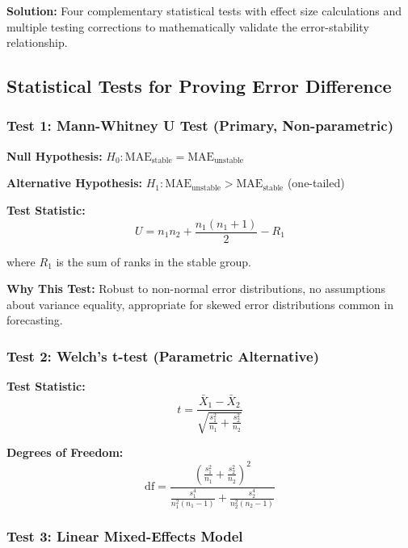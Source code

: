 \documentclass[11pt,a4paper]{article}
\begin{document}
\begin{solutionbox}
\textbf{Solution:} Four complementary statistical tests with effect size calculations and multiple testing corrections to mathematically validate the error-stability relationship.
\end{solutionbox}

\subsection{Statistical Tests for Proving Error Difference}

\subsubsection{Test 1: Mann-Whitney U Test (Primary, Non-parametric)}

\textbf{Null Hypothesis:} $H_0: \text{MAE}_{\text{stable}} = \text{MAE}_{\text{unstable}}$

\textbf{Alternative Hypothesis:} $H_1: \text{MAE}_{\text{unstable}} > \text{MAE}_{\text{stable}}$ (one-tailed)

\textbf{Test Statistic:}
\begin{equation}
U = n_1 n_2 + \frac{n_1(n_1 + 1)}{2} - R_1
\end{equation}

where $R_1$ is the sum of ranks in the stable group.

\textbf{Why This Test:} Robust to non-normal error distributions, no assumptions about variance equality, appropriate for skewed error distributions common in forecasting.

\subsubsection{Test 2: Welch's t-test (Parametric Alternative)}

\textbf{Test Statistic:}
\begin{equation}
t = \frac{\bar{X}_1 - \bar{X}_2}{\sqrt{\frac{s_1^2}{n_1} + \frac{s_2^2}{n_2}}}
\end{equation}

\textbf{Degrees of Freedom:}
\begin{equation}
\text{df} = \frac{(\frac{s_1^2}{n_1} + \frac{s_2^2}{n_2})^2}{\frac{s_1^4}{n_1^2(n_1-1)} + \frac{s_2^4}{n_2^2(n_2-1)}}
\end{equation}

\subsubsection{Test 3: Linear Mixed-Effects Model}
\end{document}
